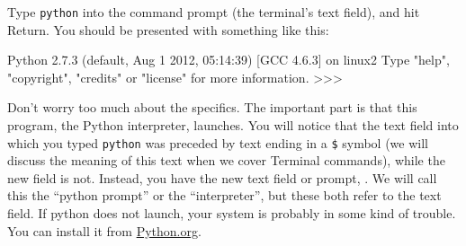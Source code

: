 Type \texttt{python} into the command prompt (the terminal's text field), and hit Return.
You should be presented with something like this:
\begin{codeblock}
Python 2.7.3 (default, Aug  1 2012, 05:14:39)
[GCC 4.6.3] on linux2
Type "help", "copyright", "credits" or "license" for more information.
>>>
\end{codeblock}
Don't worry too much about the specifics.
The important part is that this program, the Python interpreter, launches.
You will notice that the text field into which you typed \texttt{python} was preceded by text ending in a \texttt{\$} symbol (we will discuss the meaning of this text when we cover Terminal commands), while the new field is not.
Instead, you have the new text field or prompt, \pyprompt.
We will call this the ``python prompt'' or the ``interpreter'', but these both refer to the \pyprompt text field.
If python does not launch, your system is probably in some kind of trouble.
You can install it from \href{http://www.python.org/getit/mac/}{Python.org}.
